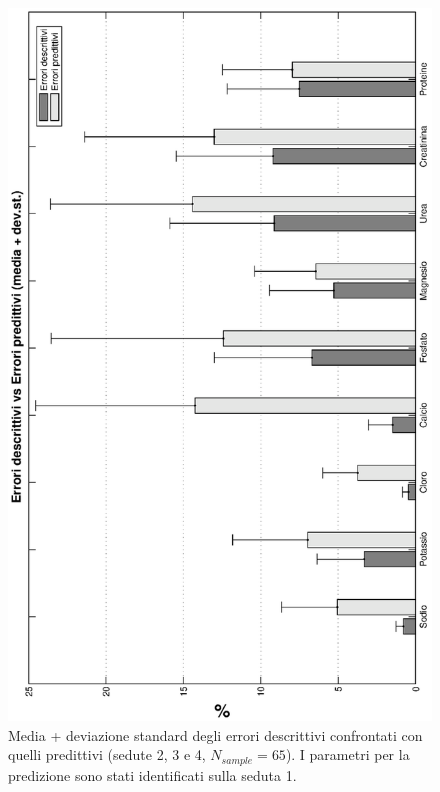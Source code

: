 \begin{figure}[!h]
\centering
		\includegraphics[angle=-90, width=\textwidth]{immagini/desVSpred.eps}
				\caption{Media + deviazione standard degli errori descrittivi confrontati con quelli predittivi (sedute 2, 3 e 4, $N_{sample}=65$). I parametri per la predizione sono stati identificati sulla seduta 1.}\label{fig:desVSpred}
\end{figure}

